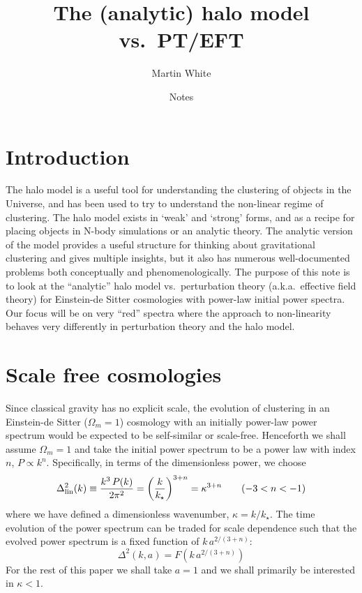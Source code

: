 \documentclass{article}
\title{The (analytic) halo model vs.\ PT/EFT}
\author{Martin White}
\date{Notes}
\begin{document}
\maketitle

\section{Introduction}

The halo model is a useful tool for understanding the clustering of objects in the Universe, and has been used to try to understand the non-linear regime of clustering.  The halo model exists in `weak' and `strong' forms, and as a recipe for placing objects in N-body simulations or an analytic theory.  The analytic version of the model provides a useful structure for thinking about
gravitational clustering and gives multiple insights, but it also has numerous well-documented problems both conceptually and phenomenologically.
The purpose of this note is to look at the ``analytic'' halo model vs.\ perturbation theory (a.k.a.\ effective field theory) for Einstein-de Sitter cosmologies with power-law initial power spectra.  Our focus will be on very ``red'' spectra where the approach to non-linearity behaves very differently in perturbation theory and the halo model.

\section{Scale free cosmologies}

Since classical gravity has no explicit scale, the evolution of clustering in an Einstein-de Sitter ($\Omega_m=1$) cosmology with an initially power-law power spectrum would be expected to be self-similar or scale-free.  Henceforth we shall assume $\Omega_m=1$ and take the initial power spectrum to be a power law with index $n$, $P\propto k^n$.  Specifically, in terms of the dimensionless power, we choose
\begin{equation}
    \Delta_{\rm lin}^2(k) \equiv \frac{k^3\,P(k)}{2\pi^2}
    = \left(\frac{k}{k_\star}\right)^{3+n} = \kappa^{3+n}
    \qquad (-3<n<-1)
\end{equation}
where we have defined a dimensionless wavenumber, $\kappa=k/k_\star$.
The time evolution of the power spectrum can be traded for scale dependence such that the evolved power spectrum is a fixed function of $k\,a^{2/(3+n)}$:
\begin{equation}
    \Delta^2(k,a) = F\left( k\, a^{2/(3+n)} \right) 
\end{equation}
For the rest of this paper we shall take $a=1$ and we shall primarily be interested in $\kappa<1$.
\end{document}
